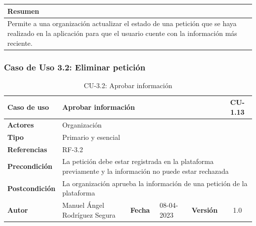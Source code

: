 \begin{table}[H]
    \centering
    \begin{tabularx}{\textwidth}{@{} |L |@{}} \hline
        \textbf{Resumen} \\
        \hline
        Permite a una organización actualizar el estado de una petición que se haya realizado en la aplicación para
    que el usuario cuente con la información más reciente. \\
        \hline
    \end{tabularx}
\end{table}

\subsubsection{Caso de Uso 3.2: Eliminar petición}\label{subsubsec:eliminar-peticion}

\begin{table}[H]
    \begin{center}
        \begin{adjustbox}{width=\textwidth}
            \begin{tabular}{ | l | l | l | l | c | c | }
                \hline
                \textbf{Caso de uso} & \multicolumn{4}{l|}{Aprobar información} & \cellcolor{gray!50} \textbf{CU-1.13}\\
                \hline
                \textbf{Actores} & \multicolumn{5}{p{0.5\linewidth}|}{Organización} \\
                \hline
                \textbf{Tipo} & \multicolumn{5}{l|}{Primario y esencial} \\
                \hline
                \textbf{Referencias} & \multicolumn{3}{l|}{RF-3.2} & \multicolumn{2}{l|}{ }\\
                \hline
                \textbf{Precondición} & \multicolumn{5}{l|}{La petición debe estar registrada en la plataforma previamente
                y la información no puede estar rechazada} \\
                \hline
                \textbf{Postcondición} & \multicolumn{5}{l|}{La organización aprueba la información de una petición de la plataforma} \\
                \hline
                \textbf{Autor} & \multicolumn{1}{p{0.25\linewidth}|}{Manuel Ángel Rodríguez Segura} & \textbf{Fecha} &
                08-04-2023     & \textbf{Versión}                                                      & 1.0\\
                \hline
            \end{tabular}
        \end{adjustbox}
        \caption{CU-3.2: Aprobar información}
        \label{tab:aprobar-informacion}
    \end{center}
\end{table}

